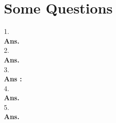 \documentclass[a4paper, 11pt]{article}
\begin{document}


\section{Some Questions}
1. \\
\textbf{Ans.}  \\
2.  \\
\textbf{Ans.} \\
3. \\ 
\textbf{Ans :} \\
4.  \\
\textbf{Ans.}
\\
5. 
\\ \textbf{Ans. } \\


\end{document}

